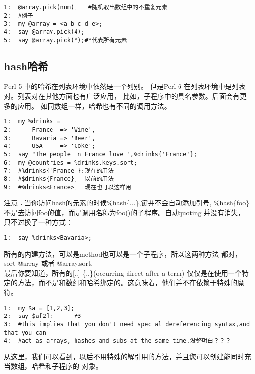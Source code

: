 \documentclass{ctexart}
\begin{document}
\begin{lstlisting}
1:  @array.pick(num);   #随机取出数组中的不重复元素
2:  #例子
3:  my @array = <a b c d e>;
4:  say @array.pick(4);
5:  say @array.pick(*);#*代表所有元素
\end{lstlisting}
\subsection{hash哈希}
\label{sec-4-2}

Perl 5 中的哈希在列表环境中依然是一个列别。
但是Perl 6 在列表环境中是列表对。列表对在其他方面也有广泛应用，
比如，子程序中的具名参数。后面会有更多的应用。
如同数组一样，哈希也有不同的调用方法。

\begin{lstlisting}
1:  my %drinks =
2:      France  => 'Wine',
3:      Bavaria => 'Beer',
4:      USA     => 'Coke';
5:  say "The people in France love ",%drinks{'France'};
6:  my @countries = %drinks.keys.sort;
7:  #%drinks{'France'};现在的用法
8:  #$drinks{France};  以前的用法
9:  #%drinks<France>;  现在也可以这样用
\end{lstlisting}
注意：当你访问hash的元素的时候\%hash\{...\},键并不会自动添加引号,
\%hash\{foo\}不是去访问foo的值，而是调用名称为foo()的子程序。自动quoting
并没有消失，只不过换了一种方式：

\begin{lstlisting}
1:  say %drinks<Bavaria>;
\end{lstlisting}
所有的内建方法，可以是method也可以是一个子程序，所以这两种方法
都对，sort @array 或者 @array.sort.\\
最后你要知道，所有的[..] \{..\}(occurring direct after a term)
仅仅是在使用一个特定的方法，而不是和数组和哈希绑定的。这意味着，他们并不在依赖于特殊的魔符。


\begin{lstlisting}
1:  my $a = [1,2,3];
2:  say $a[2];      #3
3:  #this implies that you don't need special dereferencing syntax,and that you can
4:  #act as arrays, hashes and subs at the same time.没整明白？？？
\end{lstlisting}
从这里，我们可以看到，以后不用特殊的解引用的方法，并且您可以创建能同时充当数组，哈希和子程序的
对象。
\end{document}
